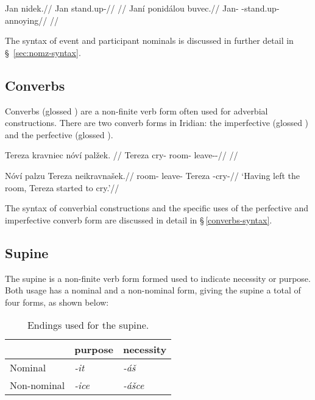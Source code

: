 \pex
\a
\begingl
\gla Jan nidek.//
\glb Jan stand.up-//
\glft {}//
\endgl
\a
\begingl
\gla Janí ponidálou buvec.//
\glb Jan-\Gen{} -stand.up- annoying//
\glft {}//
\endgl
\xe

The syntax of event and participant nominals is discussed in further detail in \S~\ref{sec:nomz-syntax}.

\subsection{Converbs}
Converbs (glossed \Cv{}) are a non-finite verb form often used for adverbial constructions. There are two converb forms in Iridian: the imperfective  (glossed ) and the perfective  (glossed ).

\pex
\begingl
\gla Tereza kravniec nóví palžek. //
\glb Tereza cry- room-\Gen{} leave-\Av{}-\Pf{}//
\glft {}//
\endgl
\xe

\pex
\begingl
\gla Nóví palzu Tereza neikravnašek.//
\glb room-\Gen{} leave- Tereza -cry-//
\glft `Having left the room, Tereza started to cry.'//
\endgl
\xe

The syntax of converbial constructions and the specific uses of the perfective and imperfective converb form are discussed in detail in \S\,\ref{converbs-syntax}.


\subsection{Supine}

The {\sc supine} is a non-finite verb form formed used to indicate necessity or purpose. Both usage has a nominal and a non-nominal form, giving the supine a total of four forms, as shown below:

\begin{table}[h!]
	\small
	\caption{Endings used for the supine.}
	\medskip
	\begin{tabu} to 0.6\textwidth{YYY}
		\toprule
		&{\sc purpose}&{\sc necessity}\\
		\midrule
		Nominal & \textit{-it} & \textit{-áš}\\
		Non-nominal & \textit{-ice} & \textit{-ášce}\\
		\bottomrule
	\end{tabu}
\end{table}

